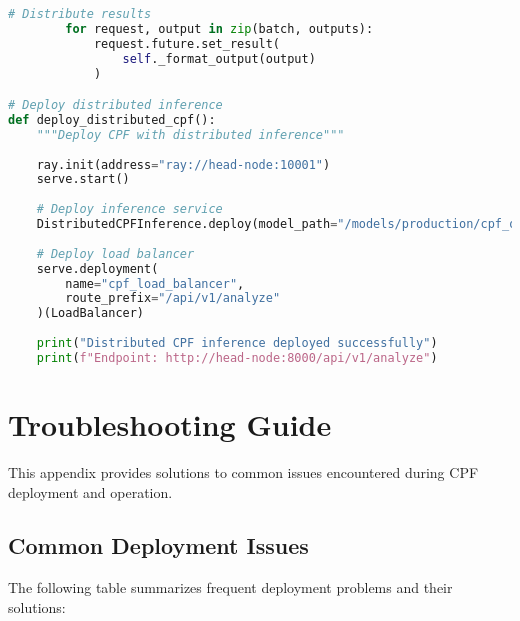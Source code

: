 \documentclass[11pt,a4paper]{article}
\begin{document}
\begin{lstlisting}[language=Python, caption=Distributed Inference System]
        # Distribute results
        for request, output in zip(batch, outputs):
            request.future.set_result(
                self._format_output(output)
            )

# Deploy distributed inference
def deploy_distributed_cpf():
    """Deploy CPF with distributed inference"""
    
    ray.init(address="ray://head-node:10001")
    serve.start()
    
    # Deploy inference service
    DistributedCPFInference.deploy(model_path="/models/production/cpf_optimized")
    
    # Deploy load balancer
    serve.deployment(
        name="cpf_load_balancer",
        route_prefix="/api/v1/analyze"
    )(LoadBalancer)
    
    print("Distributed CPF inference deployed successfully")
    print(f"Endpoint: http://head-node:8000/api/v1/analyze")
\end{lstlisting}

\section{Troubleshooting Guide}
\label{app:troubleshooting}

This appendix provides solutions to common issues encountered during CPF deployment and operation.

\subsection{Common Deployment Issues}

The following table summarizes frequent deployment problems and their solutions:
\end{document}

